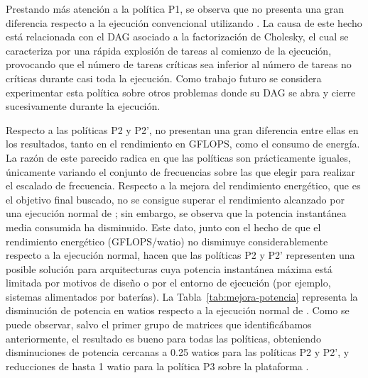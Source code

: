 Prestando más atención a la política P1, se observa que no presenta una
gran diferencia respecto a la ejecución convencional utilizando \botlev. La causa de este
hecho está relacionada con el DAG asociado a la factorización de Cholesky,
el cual se caracteriza por una rápida explosión de tareas al comienzo de la
ejecución, provocando que el número de tareas críticas sea inferior al
número de tareas no críticas durante casi toda la ejecución. Como trabajo
futuro se considera experimentar esta política sobre otros problemas donde
su DAG se abra y cierre sucesivamente durante la ejecución.

Respecto a las políticas P2 y P2', no presentan una gran diferencia entre
ellas en los resultados, tanto en el rendimiento en GFLOPS, como el consumo
de energía. La razón de este parecido radica en que las políticas son
prácticamente iguales, únicamente variando el conjunto de frecuencias sobre
las que elegir para realizar el escalado de frecuencia. Respecto a la
mejora del rendimiento energético, que es el objetivo final buscado, no se
consigue superar el rendimiento alcanzado por una ejecución normal de
\botlev; sin embargo, se observa que la potencia instantánea media consumida
ha disminuido. Este dato, junto con el hecho de que el rendimiento
energético (GFLOPS/watio) no disminuye considerablemente respecto a la
ejecución normal, hacen que las políticas P2 y P2' representen una posible
solución para arquitecturas cuya potencia instantánea máxima está limitada
por motivos de diseño o por el entorno de ejecución (por ejemplo, sistemas
alimentados por baterías). La Tabla~\ref{tab:mejora-potencia} representa la
disminución de potencia en watios respecto a la ejecución normal de
\botlev. Como se puede observar, salvo el primer grupo de matrices que
identificábamos anteriormente, el resultado es bueno para todas las políticas,
obteniendo disminuciones de potencia cercanas a 0.25 watios para las
políticas P2 y P2', y reducciones de hasta 1 watio para la política P3
sobre la plataforma \juno.

